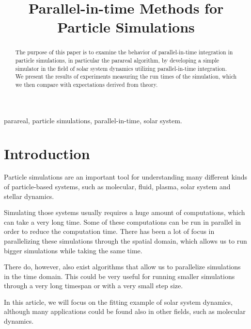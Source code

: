 \documentclass[conference]{IEEEtran}
\begin{document}
\title{Parallel-in-time Methods for Particle Simulations}

\author{
}

\maketitle

\begin{abstract}
The purpose of this paper is to examine the behavior of parallel-in-time integration in particle simulations, in particular the parareal algorithm, by developing a simple simulator in the field of solar system dynamics utilizing parallel-in-time integration. We present the results of experiments measuring the run times of the simulation, which we then compare with expectations derived from theory.
\end{abstract}

\begin{IEEEkeywords}
parareal, particle simulations, parallel-in-time, solar system.
\end{IEEEkeywords}

\section{Introduction}

Particle simulations are an important tool for understanding many different kinds of particle-based systems, such as molecular, fluid, plasma, solar system and stellar dynamics.

Simulating those systems usually requires a huge amount of computations, which can take a very long time. Some of these computations can be run in parallel in order to reduce the computation time. There has been a lot of focus in parallelizing these simulations through the spatial domain, which allows us to run bigger simulations while taking the same time.

There do, however, also exist algorithms that allow us to parallelize simulations in the time domain. This could be very useful for running smaller simulations through a very long timespan or with a very small step size. 

In this article, we will focus on the fitting example of solar system dynamics, although many applications could be found also in other fields, such as molecular dynamics. \cite{moldyn}
\end{document}
